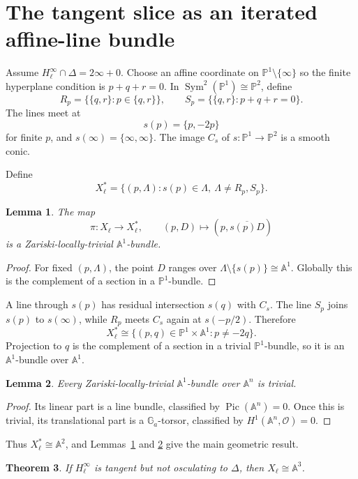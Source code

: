 \documentclass[11pt]{article}
\newcommand{\A}{\mathbb A}
\newcommand{\Pj}{\mathbb P}
\newcommand{\Sym}{\operatorname{Sym}}
\newcommand{\Pic}{\operatorname{Pic}}
\newtheorem{theorem}{Theorem}[section]
\newtheorem{lemma}[theorem]{Lemma}
\theoremstyle{remark}
\begin{document}
\section{The tangent slice as an iterated affine-line bundle}

Assume $H_\ell^\infty\cap\Delta=2\infty+0$. Choose an affine coordinate on
$\Pj^1\setminus\{\infty\}$ so the finite hyperplane condition is
$p+q+r=0$. In $\Sym^2(\Pj^1)\cong\Pj^2$, define
\[
R_p=\{\{q,r\}:p\in\{q,r\}\},
\qquad
S_p=\{\{q,r\}:p+q+r=0\}.
\]
The lines meet at
\[
s(p)=\{p,-2p\}
\]
for finite $p$, and $s(\infty)=\{\infty,\infty\}$. The image $C_s$ of
$s:\Pj^1\to\Pj^2$ is a smooth conic.

Define
\[
X_\ell^*=\{(p,\Lambda):s(p)\in\Lambda,\ \Lambda\ne R_p,S_p\}.
\]

\begin{lemma}\label{lem:first-a1}
The map
\[
\pi:X_\ell\to X_\ell^*,\qquad (p,D)\mapsto(p,\overline{s(p)D})
\]
is a Zariski-locally-trivial $\A^1$-bundle.
\end{lemma}

\begin{proof}
For fixed $(p,\Lambda)$, the point $D$ ranges over
$\Lambda\setminus\{s(p)\}\cong\A^1$. Globally this is the complement of a
section in a $\Pj^1$-bundle.
\end{proof}

A line through $s(p)$ has residual intersection $s(q)$ with $C_s$. The line
$S_p$ joins $s(p)$ to $s(\infty)$, while $R_p$ meets $C_s$ again at
$s(-p/2)$. Therefore
\[
X_\ell^*\cong
\{(p,q)\in\Pj^1\times\A^1:p\ne-2q\}.
\]
Projection to $q$ is the complement of a section in a trivial $\Pj^1$-bundle,
so it is an $\A^1$-bundle over $\A^1$.

\begin{lemma}\label{lem:a1-trivial}
Every Zariski-locally-trivial $\A^1$-bundle over $\A^n$ is trivial.
\end{lemma}

\begin{proof}
Its linear part is a line bundle, classified by $\Pic(\A^n)=0$. Once this is
trivial, its translational part is a $\mathbb G_a$-torsor, classified by
$H^1(\A^n,\mathcal O)=0$.
\end{proof}

Thus $X_\ell^*\cong\A^2$, and Lemmas~\ref{lem:first-a1} and
\ref{lem:a1-trivial} give the main geometric result.

\begin{theorem}\label{thm:tangent-a3}
If $H_\ell^\infty$ is tangent but not osculating to $\Delta$, then
$X_\ell\cong\A^3$.
\end{theorem}
\end{document}
